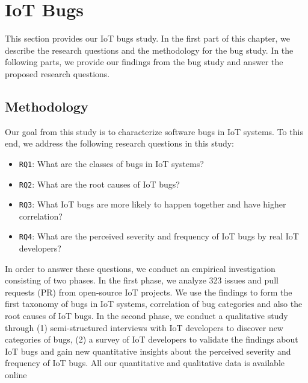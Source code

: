 
\chapter{IoT Bugs}
\label{ch:bugs}
This section provides our IoT bugs study. In the first part of this chapter, we describe the research questions and the methodology for the bug study. In the following parts, we provide our findings from the bug study and answer the proposed research questions.

\section{Methodology}
Our goal from this study is to characterize software bugs in IoT systems. To this end, we address the following research questions in this study:
\begin{itemize}
\item {\verb|RQ1|}: What are the classes of bugs in IoT systems?
\item {\verb|RQ2|}: What are the root causes of IoT bugs?
\item {\verb|RQ3|}: What IoT bugs are more likely to happen together and have higher correlation?
\item {\verb|RQ4|}: What are the perceived severity and frequency of IoT bugs by real IoT developers?

\end{itemize}
In order to answer these questions, we conduct an empirical investigation consisting of two phases. In the first phase, we analyze 323 issues and pull requests (PR) from open-source IoT projects. We use the findings to form the first taxonomy of bugs in IoT systems, correlation of bug categories and also the  root causes of IoT bugs. In the second phase, we conduct a qualitative study through (1) semi-structured interviews with IoT developers to discover new categories of bugs, (2) a survey of IoT developers to validate the findings about IoT bugs and gain new quantitative insights about the perceived severity and frequency of IoT bugs. All our quantitative and qualitative data is available online~\cite{repPack} 


